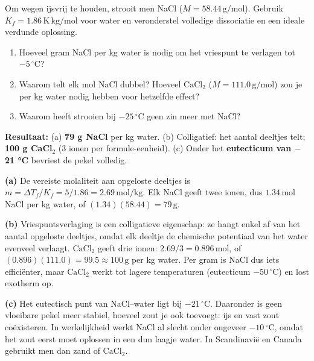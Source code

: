 \begin{oefening}
Om wegen ijsvrij te houden, strooit men NaCl (\(M = 58.44\,\mathrm{g/mol}\)). Gebruik \(K_f = 1.86\,\mathrm{K\,kg/mol}\) voor water en veronderstel volledige dissociatie en een ideale verdunde oplossing.

\begin{enumerate}
\item[(a)]
  Hoeveel gram NaCl per kg water is nodig om het vriespunt te verlagen tot \(-5\,^\circ\mathrm{C}\)?
\item[(b)]
  Waarom telt elk mol NaCl dubbel? Hoeveel \(\mathrm{CaCl_2}\) (\(M = 111.0\,\mathrm{g/mol}\)) zou je per kg water nodig hebben voor hetzelfde effect?
\item[(c)]
  Waarom heeft strooien bij \(-25\,^\circ\mathrm{C}\) geen zin meer met NaCl?
\end{enumerate}
\end{oefening}
\begin{oplossing}
\textbf{Resultaat:} (a) \textbf{79 g NaCl} per kg water. (b) Colligatief: het aantal deeltjes telt; \textbf{100 g CaCl\ensuremath{_{2}}} (3 ionen per formule-eenheid). (c) Onder het \textbf{eutecticum van \ensuremath{-}21 °C} bevriest de pekel volledig.

\textbf{(a)} De vereiste molaliteit aan opgeloste deeltjes is \(m = \Delta T_f/K_f = 5/1.86 = 2.69\,\mathrm{mol/kg}\). Elk NaCl geeft twee ionen, dus \(1.34\,\mathrm{mol}\) NaCl per kg water, of \((1.34)(58.44) = 79\,\mathrm{g}\).

\textbf{(b)} Vriespuntsverlaging is een colligatieve eigenschap: ze hangt enkel af van het aantal opgeloste deeltjes, omdat elk deeltje de chemische potentiaal van het water evenveel verlaagt. \(\mathrm{CaCl_2}\) geeft drie ionen: \(2.69/3 = 0.896\,\mathrm{mol}\), of \((0.896)(111.0) = 99.5 \approx 100\,\mathrm{g}\) per kg water. Per gram is NaCl dus iets efficiënter, maar \(\mathrm{CaCl_2}\) werkt tot lagere temperaturen (eutecticum \(-50\,^\circ\mathrm{C}\)) en lost exotherm op.

\textbf{(c)} Het eutectisch punt van NaCl--water ligt bij \(-21\,^\circ\mathrm{C}\). Daaronder is geen vloeibare pekel meer stabiel, hoeveel zout je ook toevoegt: ijs en vast zout coëxisteren. In werkelijkheid werkt NaCl al slecht onder ongeveer \(-10\,^\circ\mathrm{C}\), omdat het zout eerst moet oplossen in een dun laagje water. In Scandinavië en Canada gebruikt men dan zand of \(\mathrm{CaCl_2}\).
\end{oplossing}

